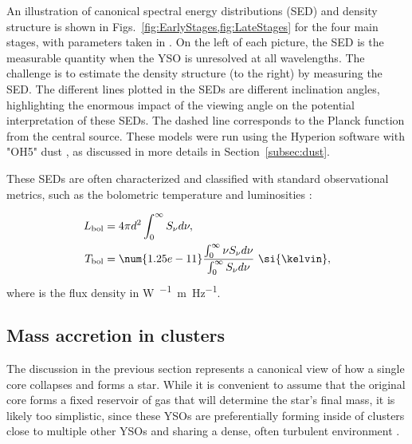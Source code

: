 An illustration of canonical spectral energy distributions (SED) and density structure is shown in Figs.~\ref{fig:EarlyStages,fig:LateStages} for the four main stages, with parameters taken in \citet{Whitney:2003kc}. On the left of each picture, the SED is the measurable quantity when the YSO is unresolved at all wavelengths. The challenge is to estimate the density structure (to the right) by measuring the SED. The different lines plotted in the SEDs are different inclination angles, highlighting the enormous impact of the viewing angle on the potential interpretation of these SEDs. The dashed line corresponds to the Planck function from the central source. These models were run using the Hyperion software \citep{Robitaille:2011fc} with "OH5" dust \citep{Ossenkopf:1994tq}, as discussed in more details in Section~\ref{subsec:dust}.

These SEDs are often characterized and classified with standard observational metrics, such as the bolometric temperature and luminosities \citep{Myers:1993en,Dunham:2010bx}:

\begin{align}
\Lbol &= 4\pi d^2\int_0^\infty\Snu d\nu,\\
\Tbol &= \num{1.25e-11} \frac{\int_0^\infty \nu\Snu d\nu}{\int_0^\infty \Snu d\nu}~\si{\kelvin},
\end{align}
%
where \Snu is the flux density in \si{\watt\per{}\meter\per\hertz}. 

\subsection{Mass accretion in clusters}


The discussion in the previous section represents a canonical view of how a single core collapses and forms a star. While it is convenient to assume that the original core forms a fixed reservoir of gas that will determine the star's final mass, it is likely too simplistic, since these YSOs are preferentially forming inside of clusters close to multiple other YSOs and sharing a dense, often turbulent environment \citep{Porras:2003kxa,Allen:2007wqa,Gutermuth:2009gca}. 


